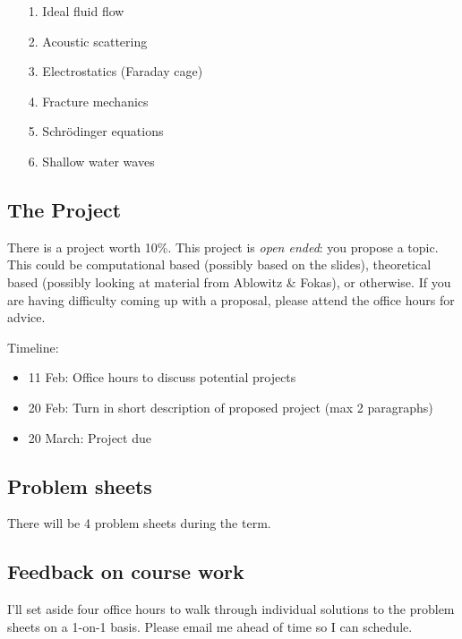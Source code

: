 \documentclass[12pt,a4paper]{article}
\begin{document}
\begin{itemize}
\item[1. ] Ideal fluid flow


\item[2. ] Acoustic scattering


\item[3. ] Electrostatics (Faraday cage)


\item[4. ] Fracture mechanics


\item[5. ] Schrödinger equations


\item[6. ] Shallow water waves

\end{itemize}
\subsection{The Project}
There is a project worth 10\%. This project is \emph{open ended}: you propose a topic. This could be computational based (possibly based on the slides), theoretical based (possibly looking at material from Ablowitz \& Fokas), or otherwise. If you are having difficulty coming up with a proposal, please attend the office hours for advice.

Timeline:

\begin{itemize}
\item 11 Feb: Office hours to discuss potential projects


\item 20 Feb: Turn in short description of proposed project (max 2 paragraphs)


\item 20 March: Project due

\end{itemize}
\subsection{Problem sheets}
There will be 4 problem sheets during the term. 

\subsection{Feedback on course work}
I'll set aside four office hours to walk  through individual solutions to the problem sheets on a 1-on-1 basis. Please email me ahead of time so I can schedule. 
\end{document}
